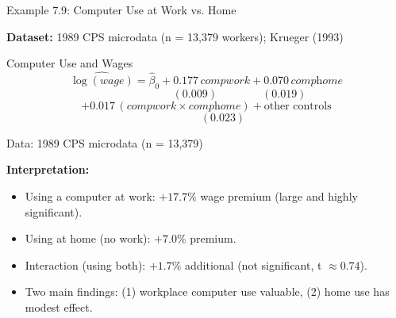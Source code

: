 \documentclass[aspectratio=169, 12pt]{beamer}
\begin{document}
\begin{frame}[shrink=25]{Example 7.9: Computer Use at Work vs. Home}

  \textbf{Dataset:} 1989 CPS microdata (n = 13,379 workers); Krueger (1993)

  \medskip

  \begin{examplebox}{Computer Use and Wages}
    \[
      \widehat{\log(\textit{wage})} = \hat{\beta}_0 + 0.177 \, \textit{compwork} + 0.070 \, \textit{comphome}
    \]
    \[
      \quad\quad\quad\quad\quad\quad (0.009) \quad\quad\quad\quad (0.019)
    \]
    \[
      + 0.017 \, (\textit{compwork} \times \textit{comphome}) + \text{other controls}
    \]
    \[
      \quad\quad\quad (0.023)
    \]
    \smallskip

    Data: 1989 CPS microdata (n = 13,379)
  \end{examplebox}

  \medskip

  \textbf{Interpretation:}

  \begin{keybox}
    \begin{itemize}
      \item Using a computer at work: $+17.7\%$ wage premium (large and highly significant).
      \item Using at home (no work): $+7.0\%$ premium.
      \item Interaction (using both): $+1.7\%$ additional (not significant, t $\approx 0.74$).
      \item Two main findings: (1) workplace computer use valuable, (2) home use has modest effect.
    \end{itemize}
  \end{keybox}

\end{frame}
\end{document}
